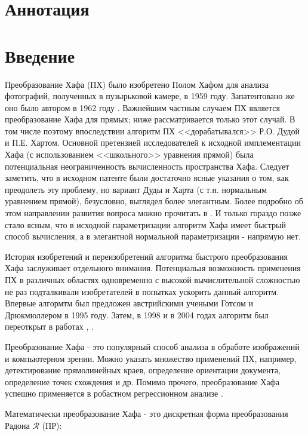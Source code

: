 \section*{Аннотация}
\section{Введение}

Преобразование Хафа (ПХ) было изобретено Полом Хафом для анализа фотографий, полученных в пузырьковой камере, в 1959 году. 
Запатентовано же оно было автором в 1962 году \cite{Hough1962patent}. 
Важнейшим частным случаем ПХ является преобразование Хафа для прямых; ниже рассматривается только этот случай. 
В том числе поэтому впоследствии алгоритм ПХ <<дорабатывался>> Р.О. Дудой и П.Е. Хартом. 
Основной претензией исследователей к исходной имплементации Хафа (с использованием <<школьного>> уравнения прямой) была потенциальная неограниченность вычисленность пространства Хафа. 
Следует заметить, что в исходном патенте были достаточно ясные указания о том, как преодолеть эту проблему, но вариант Дуды и Харта (с т.н. нормальным уравнением прямой), безусловно, выглядел более элегантным. 
Более подробно об этом направлении развития вопроса можно прочитать в \cite{Hart2009}. 
И только гораздо позже стало ясным, что в исходной параметризации алгоритм Хафа имеет быстрый способ вычисления, а в элегантной нормальной параметризации - напрямую нет. 

История изобретений и переизобретений алгоритма быстрого преобразования Хафа заслуживает отдельного внимания. 
Потенциальая возможность применения ПХ в различных областях одновременно с высокой вычислительной сложностью не раз подталкивали изобретателей в попытках ускорить данный алгоритм.
Впервые алгормтм был предложен австрийскими учеными Готсом и Дрюкмюллером \cite{Gotz1995} в 1995 году. 
Затем, в 1998 и в 2004 годах алгоритм был переоткрыт в работах \cite{Brady1998}, \cite{NiksKarp2004}.

Преобразование Хафа - это популярный способ анализа в обработе изображений и компьютерном зрении. 
Можно указать множество применений ПХ, например, детектирование прямолинейных краев, определение ориентации документа, определение точек схождения \cite{NiksKarp2008} и др. 
Помимо прочего, преобразование Хафа успешно применяется в робастном регрессионном анализе  \cite{Goldenshluger, Ballester1994, bezm2012rus}.

Математически преобразование Хафа - это дискретная форма преобразования Радона $\mathcal{R}$ (ПР):

